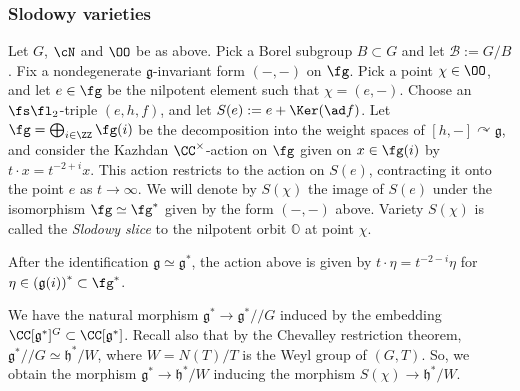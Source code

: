 \documentclass[12pt]{amsart}
\begin{document}
    
    \subsubsection{Slodowy varieties} Let $G$, $\cN$ and $\OO$ be as above. Pick a Borel subgroup $B \subset G$ and let $\mathcal{B}:=G/B$. Fix a nondegenerate $\mathfrak{g}$-invariant form $(-,-)$ on $\fg$. Pick a point $\chi\in \OO$, and let $e\in \fg$ be the nilpotent element such that $\chi=(e, -)$. Choose an $\fs\fl_2$-triple $(e,h,f)$, and let $S(e):=e+\Ker(\ad f)$. Let $\fg=\bigoplus_{i\in \ZZ} \fg(i)$ be the decomposition into the weight spaces of $[h,-] \curvearrowright \mathfrak{g}$, and consider the Kazhdan $\CC^\times$-action on $\fg$ given on $x\in \fg(i)$ by $t\cdot x=t^{-2+i}x$. This action restricts to the action on $S(e)$, contracting it onto the point $e$ as $t \rightarrow \infty$. We will denote by $S(\chi)$ the image of $S(e)$ under the isomorphism $\fg\simeq \fg^*$ given by the form $(-,-)$ above. 
    Variety $S(\chi)$ is called the {\em{Slodowy slice}} to the nilpotent orbit $\mathbb{O}$ at point $\chi$.
    
    \begin{rmk}
    After the identification $\mathfrak{g} \simeq \mathfrak{g}^*$, the action above is given by $t \cdot \eta = t^{-2-i}\eta$ for $\eta \in \left(\mathfrak{g}(i)\right )^*\subset \fg^*$. %
    \end{rmk}

    
    
    We have the natural morphism $\mathfrak{g}^* \rightarrow \mathfrak{g}^*/\!/G$ induced by the embedding $\CC[\mathfrak{g}^*]^{G} \subset \CC[\mathfrak{g}^*]$. Recall also that by the Chevalley restriction theorem, $\mathfrak{g}^*/\!/G \simeq \mathfrak{h}^*/W$, where $W=N(T)/T$ is the Weyl group of $(G,T)$. So, we obtain the morphism $\mathfrak{g}^* \rightarrow \mathfrak{h}^*/W$ inducing the morphism $S(\chi) \rightarrow \mathfrak{h}^*/W$.
    
    
    
\end{document}
